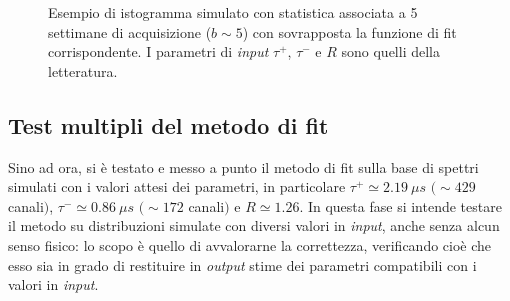 \documentclass[10pt, oneside, a4paper]{article}   	%
\begin{document}
\begin{figure}[h]
 \centerline{}
 \caption{Esempio di istogramma simulato con statistica associata a 5 settimane di acquisizione ($b\sim5$) con sovrapposta la funzione di fit corrispondente. I parametri di \textit{input} $\tau^+$, $\tau^-$ e $R$ sono quelli della letteratura.}
 \label{fig::esempio_spettro_simulato}
\end{figure}
%
\subsection{Test multipli del metodo di fit}
Sino ad ora, si è testato e messo a punto il metodo di fit sulla base di spettri simulati con i valori attesi dei parametri, in particolare $\tau^+  \simeq 2.19  \ \mu s$ $(\sim 429$ canali$)$, $\tau^- \simeq 0.86 \  \mu s$ $(\sim 172$ canali$)$ e $R\simeq1.26$. 
In questa fase si intende testare il metodo su distribuzioni simulate con diversi valori in \textit{input}, anche senza alcun senso fisico: lo scopo è quello di avvalorarne la correttezza, verificando cioè che esso sia in grado di restituire in \textit{output} stime dei parametri compatibili con i valori in \textit{input}.
\end{document}
